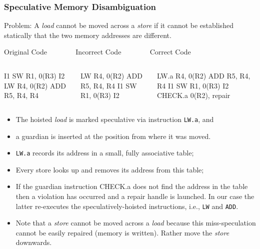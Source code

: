 \documentclass{beamer}
\renewcommand{\emph}[1]{\textcolor{structure}{#1}}
\newcommand{\emp}[1]{\textcolor{DikuRed}{ #1}}
\begin{document}
\begin{frame}[fragile,t]
    \frametitle{Speculative Memory Disambiguation}

\emp{Problem:} A {\em load} cannot be moved across a {\em store} if it cannot be 
established statically that the two memory addresses are different.

\begin{block}{Original Code{\tt~~~~~~~~}Incorrect Code{\tt~~~~~~~~}Correct Code}\vspace{-1ex}
\begin{columns}
\begin{colorcode}[fontsize=\scriptsize]
  I1
  SW  R1, 0(R3)
  I2
  LW  R4, 0(R2)
  ADD R5, R4, R4
\end{colorcode}
\begin{colorcode}[fontsize=\scriptsize]
LW  R4, 0(R2)
ADD R5, R4, R4
I1
SW  R1, 0(R3)
I2
\end{colorcode}
\begin{colorcode}[fontsize=\scriptsize]
\emph{LW.a R4, 0(R2)}
ADD  R5, R4, R4
I1
SW  R1, 0(R3)
I2
\emp{CHECK.a 0(R2), repair}
\end{colorcode}
\end{columns}
\end{block}

\bigskip

\begin{scriptsize}
\begin{itemize}
    \item The hoisted {\em load} is marked speculative via instruction \emph{{\tt LW.a}}, and
    \item a \emp{guardian} is inserted at the position from where it was moved.\pause\smallskip
 
    \item \emph{{\tt LW.a}} records its address in a small, fully associative table;
    \item Every store looks up and removes its address from this table;
    \item If the \emp{guardian} instruction \emp{CHECK.a} does not find the address in
            the table then a violation has occurred and a repair handle is launched. 
          In our case the latter re-executes the speculatively-hoisted instructions,
            i.e., {\tt LW} and {\tt ADD}.  
    \item \alert{Note that a {\em store} cannot be moved across a {\em load} because
            this miss-speculation cannot be easily repaired (memory is written). 
          Rather move the {\em store} downwards.}
\end  {itemize}
\end{scriptsize}
\end{frame}
\end{document}
